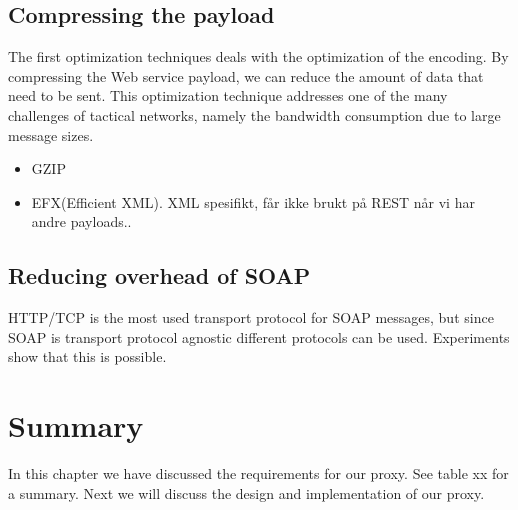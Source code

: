 \subsection{Compressing the payload}

The first optimization techniques deals with the optimization of the encoding.
By compressing the Web service payload, we can reduce the amount of data that
need to be sent. This optimization technique addresses one of the many
challenges of tactical networks, namely the bandwidth consumption due to large
message sizes.

\begin{itemize}
\item GZIP

\item EFX(Efficient XML). XML spesifikt, får ikke brukt på REST når vi har andre
payloads..

\end{itemize}

\subsection{Reducing overhead of SOAP}
HTTP/TCP is the most used transport protocol for SOAP messages, but since SOAP is transport protocol agnostic different protocols can be used. Experiments show that this is possible.


\section{Summary}

In this chapter we have discussed the requirements for our proxy. See table xx for a summary. Next we will discuss the design and implementation of our proxy.